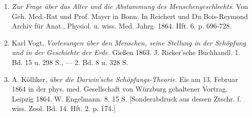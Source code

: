 \documentclass[a4paper, 11pt, oneside, english]{article}
\begin{document}
\begin{enumerate}
    \item \emph{Zur Frage über das Alter und die Abstammung des Menschengeschlechts}. Von Geh. Med.-Rat und Prof. Mayer in Bonn. In Reichert und Du Bois-Reymond Archiv für Anat., Physiol. u. wiss. Med. Jahrg. 1864. Hft. 6. p. 696-728.

    \item Karl Vogt, \emph{Vorlesungen über den Menschen, seine Stellung in der Schöpfung und in der Geschichte der Erde}. Gießen 1863. J. Ricker'sche Buchhandl. 1. Bd. 15 u. 298 S., --- 2. Bd. 8 u. 328 S.

    \item A. Kölliker, \emph{über die Darwin'sche Schöpfungs-Theorie}. Eis am 13. Februar 1864 in der phys. med. Gesellschaft von Würzburg gehaltener Vortrag. Leipzig 1864. W. Engelmann. 8. 15 S. [Sonderabdruck aus dessen Ztschr. f. wiss. Zool. Bd. 14. Hft. 2. p. 174.]
\end{enumerate}
\end{document}
